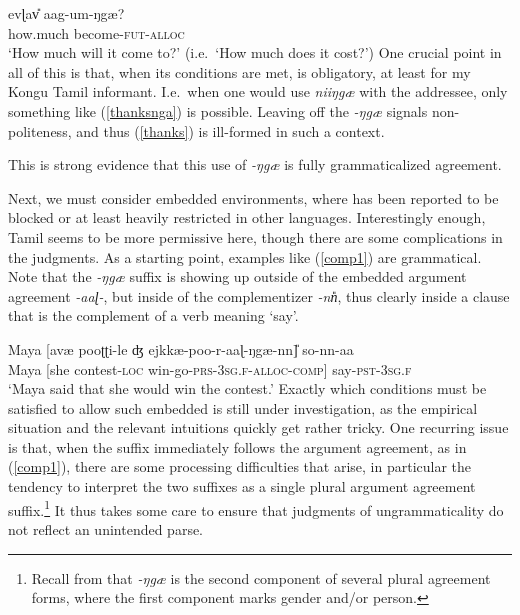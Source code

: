 \documentclass[output=paper, modfonts, nonflat]{langsci/langscibook}
\begin{document}
\ea\label{whquestion}\gll evɭav\U{} aag-um-ŋgæ?\\
{how.much} become-\textsc{fut}-\textsc{alloc}\\
\glt `How much will it come to?' (i.e.\ `How much does it cost?')
\z
%
One crucial point in all of this is that, when its conditions are met,
\allagr{} is obligatory, at least for my Kongu Tamil informant.  I.e.\
when one would use \textit{niiŋgæ} with the addressee, only something
like (\ref{thanksnga}) is possible. Leaving off the \textit{-ŋgæ}
signals non-politeness, and thus (\ref{thanks}) is ill-formed in such
a context.

\ea\label{oblig}
 \z
\z
%
This is strong evidence that this use of \textit{-ŋgæ} is fully
grammaticalized agreement.


Next, we must consider embedded environments, where \allagr{} has been
reported to be blocked or at least heavily restricted in other
languages. Interestingly enough, Tamil seems to be more permissive
here, though there are some complications in the judgments. As a
starting point, examples like (\ref{comp1}) are grammatical. Note that
the \textit{-ŋgæ} suffix is showing up outside of the embedded
argument agreement \textit{-aaɭ-}, but inside of the complementizer
\textit{-nn\U}, thus clearly inside a clause that is the complement of
a verb meaning `say'.  

\ea\label{comp1}\gll Maya [avæ pooʈʈi-le ʤ
ejkkæ-poo-r-aaɭ-ŋgæ-nn\U] so-nn-aa\\  
Maya [she contest-\textsc{loc}{} win-go-\textsc{prs}-3\textsc{sg.f}-\textsc{alloc}-\textsc{comp}]
say-\textsc{pst}-3\textsc{sg.f}\\ 
\glt `Maya said that she would win the contest.'
\z
%
Exactly which conditions must be satisfied to allow such embedded
\allagr{} is still under investigation, as the empirical situation and
the relevant intuitions quickly get rather tricky. One recurring issue
is that, when the \allagr{} suffix immediately follows the argument
agreement, as in (\ref{comp1}), there are some processing difficulties
that arise, in particular the tendency to interpret the two suffixes
as a single plural argument agreement suffix.\footnote{Recall from
  \tabref{tab:agrforms} that \textit{-ŋgæ} is the second component
  of several plural agreement forms, where the first component marks
  gender and/or person.} It thus takes some care to ensure that
judgments of ungrammaticality do not reflect an unintended parse.
\end{document}

